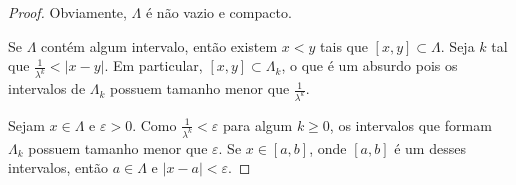 \begin{proof}
Obviamente, $\Lambda$ é não vazio e compacto.

Se $\Lambda$ contém algum intervalo, então existem $x < y$ tais que $[x, y] \subset \Lambda$.
Seja $k$ tal que $\frac{1}{\lambda^k} < |x - y|$.
Em particular, $[x, y] \subset \Lambda_k$, o que é um absurdo pois os intervalos de $\Lambda_k$ possuem tamanho menor que $\frac{1}{\lambda^k}$.

Sejam $x \in \Lambda$ e $\varepsilon > 0$.
Como $\frac{1}{\lambda^k} < \varepsilon$ para algum $k \geq 0$, os intervalos que formam $\Lambda_k$ possuem tamanho menor que $\varepsilon$.
Se $x \in [a, b]$, onde $[a, b]$ é um desses intervalos, então $a \in \Lambda$ e $|x - a| < \varepsilon$.
\end{proof}
